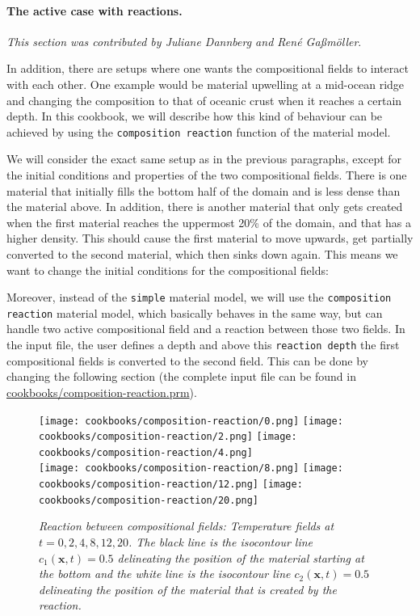 \documentclass{article}
\begin{document}
\paragraph{The active case with reactions.}

\textit{This section was contributed by Juliane Dannberg and Ren{\'e} Ga{\ss}m{\"o}ller}.

In addition, there are setups where one wants the compositional fields to interact with each other. One example would be material upwelling at a mid-ocean ridge and changing the composition to that of oceanic crust when it reaches a certain depth. In this cookbook, we will describe how this kind of behaviour can be achieved by using the \texttt{composition reaction} function of the material model. 

We will consider the exact same setup as in the previous paragraphs, except for the initial conditions and properties of the two compositional fields. There is one material that initially fills the bottom half of the domain and is less dense than the material above. In addition, there is another material that only gets created when the first material reaches the uppermost 20\% of the domain, and that has a higher density. This should cause the first material to move upwards, get partially converted to the second material, which then sinks down again. This means we want to change the initial conditions for the compositional fields: 




Moreover, instead of the \texttt{simple} material model, we will use the \texttt{composition reaction} material model, which basically behaves in the same way, but can handle two active compositional field and a reaction between those two fields. In the input file, the user defines a depth and above this \texttt{reaction depth} the first compositional fields is converted to the second field. This can be done by changing the following section (the complete input file can be found in \url{cookbooks/composition-reaction.prm}). 



\begin{figure}
  \centering
  \texttt{[image: cookbooks/composition-reaction/0.png]}
  \hfill
  \texttt{[image: cookbooks/composition-reaction/2.png]}
  \hfill
  \texttt{[image: cookbooks/composition-reaction/4.png]}
  \\[6pt]
  \texttt{[image: cookbooks/composition-reaction/8.png]}
  \hfill
  \texttt{[image: cookbooks/composition-reaction/12.png]}
  \hfill
  \texttt{[image: cookbooks/composition-reaction/20.png]}
  \caption{\it Reaction between compositional fields: Temperature fields at $t=0, 2, 4, 8,
  12, 20$. The black line is the isocontour line $c_1(\mathbf x,t)=0.5$
    delineating the position of the material starting at the bottom and the white line is the    isocontour line $c_2(\mathbf x,t)=0.5$
    delineating the position of the material that is created by the reaction.}
  \label{fig:composition-reaction}
\end{figure}
\end{document}
